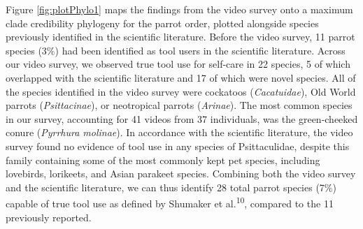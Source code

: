 \documentclass[
  man, donotrepeattitle,floatsintext]{apa6}
\begin{document}
Figure \ref{fig:plotPhylo1} maps the findings from the video survey onto a
maximum clade credibility phylogeny for the parrot order, plotted alongside
species previously identified in the scientific literature. Before the video
survey, 11 parrot species (3\%) had been identified as tool users in the
scientific literature. Across our video survey, we observed true tool use for self-care in
22
species, 5 of which overlapped with the scientific literature and
17
of which were novel species. All of the species identified in the video survey
were cockatoos (\emph{Cacatuidae}), Old World parrots (\emph{Psittacinae}), or neotropical
parrots (\emph{Arinae}). The most common species in our survey, accounting for
41 videos from
37
individuals, was the green-cheeked conure (\emph{Pyrrhura molinae}). In accordance
with the scientific literature, the video survey found no evidence of tool use
in any species of Psittaculidae, despite this family containing some of the most
commonly kept pet species, including lovebirds, lorikeets, and Asian parakeet
species. Combining both the video survey and the scientific literature, we can
thus identify 28 total parrot species (7\%) capable of true tool use as defined
by Shumaker et al.\textsuperscript{10}, compared to the 11 previously reported.
\end{document}
